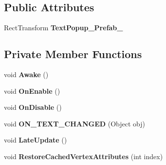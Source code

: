 \subsection*{Public Attributes}
\begin{DoxyCompactItemize}
\item 
\mbox{\label{class_t_m_pro_1_1_examples_1_1_t_m_p___text_selector___b_afab51f8e6ae2f2c170a2fbee569f29d7}} 
Rect\+Transform {\bfseries Text\+Popup\+\_\+\+Prefab\+\_}
\end{DoxyCompactItemize}
\subsection*{Private Member Functions}
\begin{DoxyCompactItemize}
\item 
\mbox{\label{class_t_m_pro_1_1_examples_1_1_t_m_p___text_selector___b_a5211a7b00934843886fb233af685fee5}} 
void {\bfseries Awake} ()
\item 
\mbox{\label{class_t_m_pro_1_1_examples_1_1_t_m_p___text_selector___b_a843b01a3c9aa9d67141dad4f4e14a350}} 
void {\bfseries On\+Enable} ()
\item 
\mbox{\label{class_t_m_pro_1_1_examples_1_1_t_m_p___text_selector___b_a4f7946ba89595b7d49f626c762ae71af}} 
void {\bfseries On\+Disable} ()
\item 
\mbox{\label{class_t_m_pro_1_1_examples_1_1_t_m_p___text_selector___b_a63825ea0beb3c2879827bba4df898cd3}} 
void {\bfseries O\+N\+\_\+\+T\+E\+X\+T\+\_\+\+C\+H\+A\+N\+G\+ED} (Object obj)
\item 
\mbox{\label{class_t_m_pro_1_1_examples_1_1_t_m_p___text_selector___b_a9438ff90b28fc23cc6f9650547872ae1}} 
void {\bfseries Late\+Update} ()
\item 
\mbox{\label{class_t_m_pro_1_1_examples_1_1_t_m_p___text_selector___b_a9e7267784ba9f40f798821bbc79e0b56}} 
void {\bfseries Restore\+Cached\+Vertex\+Attributes} (int index)
\end{DoxyCompactItemize}
